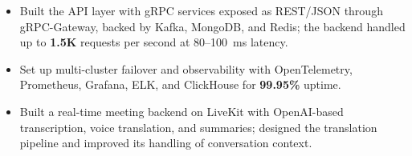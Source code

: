 
\projDattingQ
\begin{itemize}
    \item Built the API layer with gRPC services exposed as REST/JSON through gRPC-Gateway, backed by Kafka, MongoDB, and Redis; the backend handled up to \textbf{1.5K} requests per second at 80--100~ms latency. %
    \item Set up multi-cluster failover and observability with OpenTelemetry, Prometheus, Grafana, ELK, and ClickHouse for \textbf{99.95\%} uptime. %
\end{itemize}

\projMeetQ
\begin{itemize}
    \item Built a real-time meeting backend on LiveKit with OpenAI-based transcription, voice translation, and summaries; designed the translation pipeline and improved its handling of conversation context. %
\end{itemize}

\cveducation


